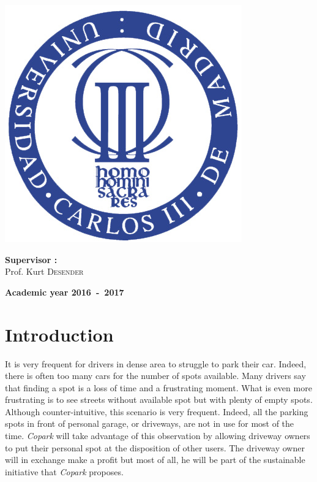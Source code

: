 \documentclass[12pt,a4paper,oneside]{book}
\newcommand{\bp}{\textit{Copark}}
\begin{document}
\begin{titlepage}
\begin{center}
\includegraphics[keepaspectratio=true,width=\textwidth-2cm]{../images/Seal_of_the_University_of_Carlos_III.jpg}
\vfill{}
\begin{flushleft}{\large \textbf{Supervisor  :}}\\
{\large Prof. Kurt \textsc{Desender}}
\end{flushleft}{\large\par}
\vfill{}\vfill{}\enlargethispage{2cm}
\textbf{Academic year 2016~-~2017}
\end{center}
\end{titlepage}



\newpage
\thispagestyle{empty} 
\null

\frontmatter

\tableofcontents

\mainmatter

\chapter{Introduction}

It is very frequent for drivers in dense area to struggle to park their car. Indeed, there is often too many cars for the number of spots available. Many drivers say that finding a spot is a loss of time and a frustrating moment. What is even more frustrating is to see streets without available spot but with plenty of empty spots. Although counter-intuitive, this scenario is very frequent. Indeed, all the parking spots in front of personal garage, or driveways, are not in use for most of the time. \bp{} will take advantage of this observation by allowing driveway owners to put their personal spot at the disposition of other users. The driveway owner will in exchange make a profit but most of all, he will be part of the sustainable initiative that \bp{} proposes.\\
\end{document}
